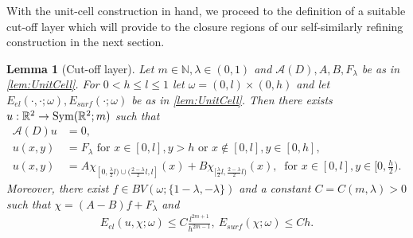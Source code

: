 \documentclass[a4paper, 10pt, twoside, notitlepage]{amsart}
\theoremstyle{plain}
\newtheorem{lem}[prop]{Lemma}
\newcommand{\R}{\mathbb{R}}
\newcommand{\N}{\mathbb{N}}
\newcommand{\A}{\mathcal{A}}
\begin{document}
		With the unit-cell construction in hand, we proceed to the definition of a suitable cut-off layer which will provide to the closure regions of our self-similarly refining construction in the next section.
		
		\begin{lem}[Cut-off layer] \label{lem:UpperCutOff} Let $m \in \N, \lambda \in (0,1)$ and $\A(D),A,B, F_\lambda$ be as in \cref{lem:UnitCell}.  For $0 < h \leq l \leq 1$ let
			$\omega = (0,l) \times (0,h)$ and let $E_{el}(\cdot,\cdot;\omega),E_{surf}(\cdot;\omega)$ be as in \cref{lem:UnitCell}.  Then there exists $u: \R^2 \to \textup{Sym}(\R^2;m)$ such that
			\begin{align*}
				\A(D) u & = 0, \\
				u(x,y) & = F_\lambda \text{ for } x \in [0,l], y > h \text{ or } x \notin [0,l], y \in [0,h], \\
				u(x,y) & = A \chi_{[0,\frac{\lambda}{2}l) \cup (\frac{2-\lambda}{2}l,l]}(x) + B \chi_{[\frac{\lambda}{2}l,\frac{2-\lambda}{2}l)}(x), \ \text{ for } x \in [0,l], y \in [0,\frac{h}{2}).
			\end{align*}
			Moreover, there exist $f \in BV(\omega;\{1-\lambda,-\lambda\})$ and a constant $C = C(m,\lambda)>0$ such that $\chi = (A-B)f + F_\lambda$ and
			\begin{align*}
				E_{el}(u,\chi;\omega) \leq C \frac{l^{2m+1}}{h^{2m-1}}, \ E_{surf}(\chi;\omega) \leq C h.
			\end{align*}
		\end{lem}
		
\end{document}
